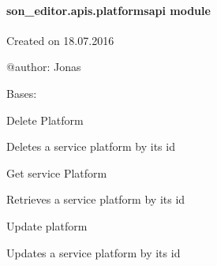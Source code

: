 \documentclass[letterpaper,10pt,english]{sphinxmanual}
\begin{document}
\paragraph{son\_editor.apis.platformsapi module}
\label{_source/son_editor.apis:module-son_editor.apis.platformsapi}\label{_source/son_editor.apis:son-editor-apis-platformsapi-module}
Created on 18.07.2016

@author: Jonas

\begin{fulllineitems}
\label{_source/son_editor.apis:son_editor.apis.platformsapi.Platform}
Bases: 

\begin{fulllineitems}
\label{_source/son_editor.apis:son_editor.apis.platformsapi.Platform.delete}
Delete Platform

Deletes a service platform by its id

\end{fulllineitems}


\begin{fulllineitems}
\label{_source/son_editor.apis:son_editor.apis.platformsapi.Platform.get}
Get service Platform

Retrieves a service platform by its id

\end{fulllineitems}


\begin{fulllineitems}
\label{_source/son_editor.apis:son_editor.apis.platformsapi.Platform.methods}
\end{fulllineitems}


\begin{fulllineitems}
\label{_source/son_editor.apis:son_editor.apis.platformsapi.Platform.put}
Update platform

Updates a service platform by its id

\end{fulllineitems}


\end{fulllineitems}
\end{document}
